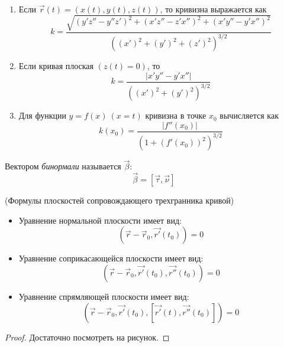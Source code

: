\begin{corollary}~
	\begin{enumerate}
		\item Если $\vec{r}(t) = (x(t), y(t), z(t))$, то кривизна выражается как
		\[
			k = \frac{\sqrt{(y'z'' - y''z')^2 + (x'z'' - z'x'')^2 + (x'y'' - y'x'')^2}}{\left((x')^2 + (y')^2 + (z')^2\right)^{3/2}}
		\]
		
		\item Если кривая плоская $(z(t) = 0)$, то
		\[
			k = \frac{|x'y'' - y'x''|}{\left((x')^2 + (y')^2\right)^{3/2}}
		\]
		
		\item Для функции $y = f(x)\ (x = t)$ кривизна в точке $x_0$ вычисляется как
		\[
			k(x_0) = \frac{|f''(x_0)|}{\left(1 + (f'(x_0))^2\right)^{3/2}}
		\]
	\end{enumerate}
\end{corollary}

\begin{definition}
	Вектором \textit{бинормали} называется $\vec{\beta}$:
	\[
		\vec{\beta} = [\vec{\tau}, \vec{\nu}]
	\]
\end{definition}


\begin{theorem} (Формулы плоскостей сопровождающего трехгранника кривой)
	\begin{itemize}
		\item Уравнение нормальной плоскости имеет вид:
		\[
			(\vec{r} - \vec{r}_0, \vec{r'}(t_0)) = 0
		\]
		
		\item Уравнение соприкасающейся плоскости имеет вид:
		\[
			(\vec{r} - \vec{r}_0, \vec{r'}(t_0), \vec{r''}(t_0)) = 0
		\]
		
		\item Уравнение спрямляющей плоскости имеет вид:
		\[
			\left(\vec{r} - \vec{r}_0, \vec{r'}(t_0), \left[\vec{r'}(t), \vec{r''}(t_0)\right]\right) = 0
		\]
	\end{itemize}
\end{theorem}

\begin{proof}
	Достаточно посмотреть на рисунок.
\end{proof}